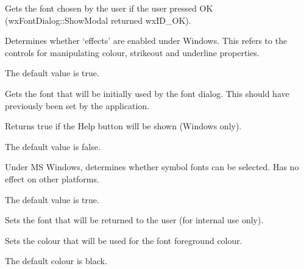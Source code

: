 \label{wxfontdatagetchosenfont}


Gets the font chosen by the user if the user pressed OK (wxFontDialog::ShowModal returned wxID\_OK).

\label{wxfontdatagetenableeffects}


Determines whether `effects' are enabled under Windows. This refers to the
controls for manipulating colour, strikeout and underline properties.

The default value is true.

\label{wxfontdatagetinitialfont}


Gets the font that will be initially used by the font dialog. This should have
previously been set by the application.

\label{wxfontdatagetshowhelp}


Returns true if the Help button will be shown (Windows only).

The default value is false.

\label{wxfontdatasetallowsymbols}


Under MS Windows, determines whether symbol fonts can be selected. Has no
effect on other platforms.

The default value is true.

\label{wxfontdatasetchosenfont}


Sets the font that will be returned to the user (for internal use only).

\label{wxfontdatasetcolour}


Sets the colour that will be used for the font foreground colour.

The default colour is black.

